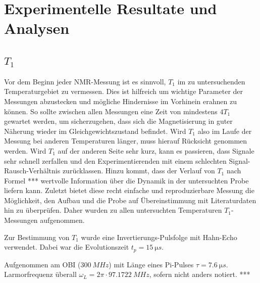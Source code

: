 \chapter{Experimentelle Resultate und Analysen}
\label{chapter:experiment}

\section{$T_1$} \label{section:res:T_1}

Vor dem Beginn jeder NMR-Messung ist es sinnvoll, $T_1$ im zu untersuchenden Temperaturgebiet zu vermessen. Dies ist hilfreich um wichtige Parameter der Messungen abzustecken und mögliche Hindernisse im Vorhinein erahnen zu können. So sollte zwischen allen Messungen eine Zeit von mindestens $4 T_1$ gewartet werden, um sicherzugehen, dass sich die Magnetisierung in guter Näherung wieder im Gleichgewichtszustand befindet. Wird $T_1$ also im Laufe der Messung bei anderen Temperaturen länger, muss hierauf Rücksicht genommen werden. Wird $T_1$ auf der anderen Seite sehr kurz, kann es passieren, dass Signale sehr schnell zerfallen und den Experimentierenden mit einem schlechten Signal-Rausch-Verhältnis zurücklassen. Hinzu kommt, dass der Verlauf von $T_1$ nach Formel *** wertvolle Information über die Dynamik in der untersuchten Probe liefern kann. Zuletzt bietet diese recht einfache und reproduzierbare Messung die Möglichkeit, den Aufbau und die Probe auf Übereinstimmung mit Literaturdaten hin zu überprüfen. Daher wurden zu allen untersuchten Temperaturen $T_1$-Messungen aufgenommen.

Zur Bestimmung von $T_1$ wurde eine Invertierungs-Pulsfolge mit Hahn-Echo verwendet. Dabei war die Evolutionszeit $t_p = \SI{15}{\micro s}$.

Aufgenommen am OBI ($\SI{300}{MHz}$) mit Länge eines Pi-Pulses $\tau = \SI{7.6}{\micro s}$. Larmorfrequenz überall $\omega_L = 2 \pi \cdot \SI{97.1722}{MHz}$, sofern nicht anders notiert. ***

